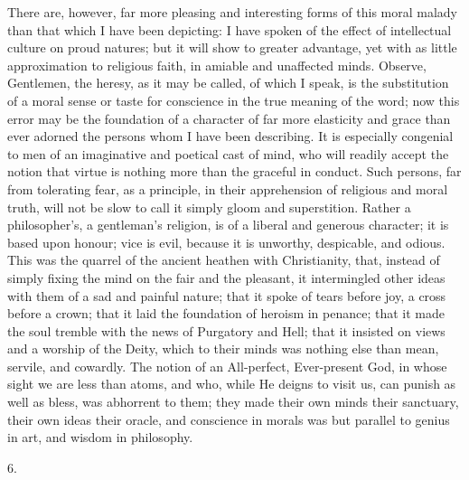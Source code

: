 There are, however, far more pleasing and interesting forms of this
moral malady than that which I have been depicting: I have
spoken of the effect of intellectual culture on proud natures; but it
will show to greater advantage, yet with as little approximation to
religious faith, in amiable and unaffected minds. Observe, Gentlemen,
the heresy, as it may be called, of which I speak, is the substitution
of a moral sense or taste for conscience in the true meaning of the
word; now this error may be the foundation of a character of far more
elasticity and grace than ever adorned the persons whom I have been
describing. It is especially congenial to men of an imaginative and
poetical cast of mind, who will readily accept the notion that virtue
is nothing more than the graceful in conduct. Such persons, far from
tolerating fear, as a principle, in their apprehension of religious
and moral truth, will not be slow to call it simply gloom and
superstition. Rather a philosopher's, a gentleman's religion, is of a
liberal and generous character; it is based upon honour; vice is evil,
because it is unworthy, despicable, and odious. This was the quarrel
of the ancient heathen with Christianity, that, instead of simply
fixing the mind on the fair and the pleasant, it intermingled other
ideas with them of a sad and painful nature; that it spoke of tears
before joy, a cross before a crown; that it laid the foundation of
heroism in penance; that it made the soul tremble with the news of
Purgatory and Hell; that it insisted on views and a worship of the
Deity, which to their minds was nothing else than mean, servile, and
cowardly. The notion of an All-perfect, Ever-present God, in whose
sight we are less than atoms, and who, while He deigns to visit us,
can punish as well as bless, was abhorrent to them; they made their
own minds their sanctuary, their own ideas their oracle, and
conscience in morals was but parallel to genius in art, and wisdom in
philosophy.

6.

